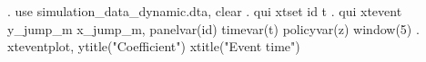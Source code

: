 . use simulation_data_dynamic.dta, clear
{\smallskip}
. qui xtset id t 
{\smallskip}
. qui xtevent y_jump_m x_jump_m, panelvar(id) timevar(t) policyvar(z) window(5) 
{\smallskip}
. xteventplot, ytitle("Coefficient") xtitle("Event time")
